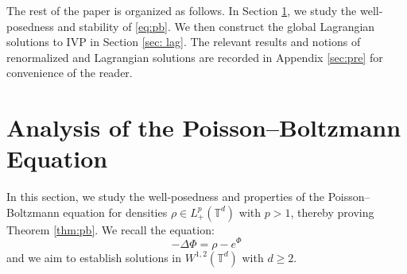 \documentclass[11pt,reqno,a4paper]{amsart}
\theoremstyle{definition}
\theoremstyle{remark}
\numberwithin{equation}{section}
\newcommand{\T} {\mathbb T}
\newcommand{\bq}{\begin{equation}}
\newcommand{\eq}{\end{equation}}
\begin{document}
The rest of the paper is organized as follows. In Section \ref{sec:pb}, we study the well-posedness and stability of \eqref{eq:pb}. We then construct the global Lagrangian solutions to IVP in Section \ref{sec: lag}. The relevant results and notions of renormalized and Lagrangian solutions are recorded in Appendix \ref{sec:pre} for convenience of the reader.






%
%
%
%
%





%
%
%
%
%
\section{Analysis of the Poisson--Boltzmann Equation} \label{sec:pb}

In this section, we study the well-posedness and properties of the Poisson--Boltzmann equation for densities $\rho\in L^p_+(\T^d)$ with $p > 1$, thereby proving Theorem \ref{thm:pb}. We recall the equation:
\bq\label{eq:pb0}
-\Delta \Phi = \rho - e^{\Phi}
\eq
and we aim to establish solutions in $W^{1,2}(\T^d)$ with $d \ge2$. 
\end{document}
